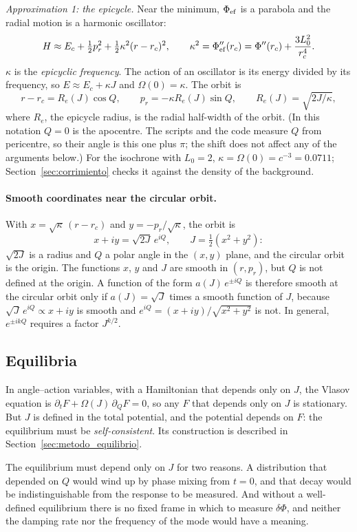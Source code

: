 \documentclass[11pt,a4paper]{article}
\begin{document}
\emph{Approximation 1: the epicycle.} Near the minimum, $\Phi_{\rm ef}$ is a parabola and
the radial motion is a harmonic oscillator:
\[
  H \approx E_c + \tfrac12 p_r^2 + \tfrac12\kappa^2(r-r_c)^2, \qquad
  \kappa^2 = \Phi_{\rm ef}''(r_c) = \Phi''(r_c)+\frac{3L_0^2}{r_c^4} .
\]
$\kappa$ is the \emph{epicyclic frequency}. The action of an oscillator is its energy divided
by its frequency, so $E\approx E_c+\kappa J$ and $\Omega(0)=\kappa$. The orbit is
\[
  r - r_c = R_e(J)\cos Q, \qquad p_r = -\kappa R_e(J)\sin Q, \qquad
  R_e(J) = \sqrt{2J/\kappa},
\]
where $R_e$, the epicycle radius, is the radial half-width of the orbit. (In this
notation $Q=0$ is the apocentre. The scripts and the code measure $Q$ from pericentre, so
their angle is this one plus $\pi$; the shift does not affect any of the arguments
below.) For the isochrone with $L_0=2$, $\kappa=\Omega(0)=c^{-3}=0.0711$; Section~\ref{sec:corrimiento}
checks it against the density of the background.

\paragraph{Smooth coordinates near the circular orbit.} With $x=\sqrt\kappa\,(r-r_c)$ and
$y=-p_r/\sqrt\kappa$, the orbit is
\[
  x+iy = \sqrt{2J}\,e^{iQ}, \qquad J=\tfrac12(x^2+y^2):
\]
$\sqrt{2J}$ is a radius and $Q$ a polar angle in the $(x,y)$ plane, and the circular orbit is
the origin. The functions $x$, $y$ and $J$ are smooth in $(r,p_r)$, but $Q$ is not defined at
the origin. A function of the form $a(J)\,e^{\pm iQ}$ is therefore smooth at the circular
orbit only if $a(J)=\sqrt J$ times a smooth function of $J$, because
$\sqrt J\,e^{iQ}\propto x+iy$ is smooth and $e^{iQ}=(x+iy)/\sqrt{x^2+y^2}$ is not. In
general, $e^{\pm ikQ}$ requires a factor $J^{k/2}$.

\subsection{Equilibria}
\label{sec:equilibrio}
\label{sec:familias}

In angle--action variables, with a Hamiltonian that depends only on $J$, the Vlasov
equation is $\partial_tF+\Omega(J)\,\partial_QF=0$, so any $F$ that depends only on $J$ is
stationary. But $J$ is defined in the total potential, and the potential depends on $F$:
the equilibrium must be \emph{self-consistent}. Its construction is described in
Section~\ref{sec:metodo_equilibrio}.

The equilibrium must depend only on $J$ for two reasons. A distribution that depended on
$Q$ would wind up by phase mixing from $t=0$, and that decay would be indistinguishable
from the response to be measured. And without a well-defined equilibrium there is no
fixed frame in which to measure $\delta\Phi$, and neither the damping rate nor the
frequency of the mode would have a meaning.
\end{document}
